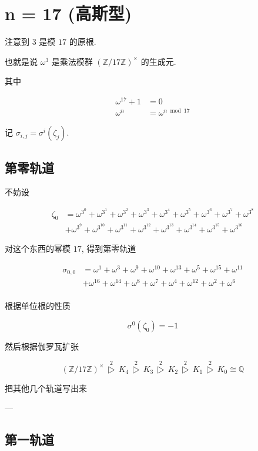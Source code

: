 \chapter{n = 17 (高斯型)}\label{ch:cos17}

注意到 $3$ 是模 $17$ 的原根.

也就是说 $ω^3$ 是乘法模群 $(\mathbb{Z}/17\mathbb{Z})^{×}$ 的生成元.

其中

$$
\begin{aligned}
ω^{17} + 1& = 0\\
ω^{n} &= ω^{n\bmod 17}
\end{aligned}
$$

记 $σ_{i,j} = σ^{i}(ζ_{j})$.

\section{第零轨道}

不妨设

$$
\begin{aligned}
ζ_0
&=ω^{3^{0}}+ω^{3^{1}}+ω^{3^{2}}+ω^{3^{3}}+ω^{3^{4}}+ω^{3^{5}}+ω^{3^{6}}+ω^{3^{7}}+ω^{3^{8}}\\
&+ω^{3^{9}}+ω^{3^{10}}+ω^{3^{11}}+ω^{3^{12}}+ω^{3^{13}}+ω^{3^{14}}+ω^{3^{15}}+ω^{3^{16}}
\end{aligned}
$$

对这个东西的幂模 $17$, 得到第零轨道

$$
\begin{aligned}
σ_{0,0}
&=ω^{1}+ω^{3}+ω^{9}+ω^{10}+ω^{13}+ω^{5}+ω^{15}+ω^{11}\\
&+ω^{16}+ω^{14}+ω^{8}+ω^{7}+ω^{4}+ω^{12}+ω^{2}+ω^{6}\\
\end{aligned}
$$

根据单位根的性质

$$σ^{0}(ζ_{0})=-1$$

然后根据伽罗瓦扩张 

$$
(\mathbb{Z}/17\mathbb{Z})^{×}
{\,\mathop▷\limits^2\,} K_{4}
{\,\mathop▷\limits^2\,} K_{3}
{\,\mathop▷\limits^2\,} K_{2}
{\,\mathop▷\limits^2\,} K_{1}
{\,\mathop▷\limits^2\,} K_{0}
≅ \mathbb{Q}
$$

把其他几个轨道写出来

---

\section{第一轨道}


